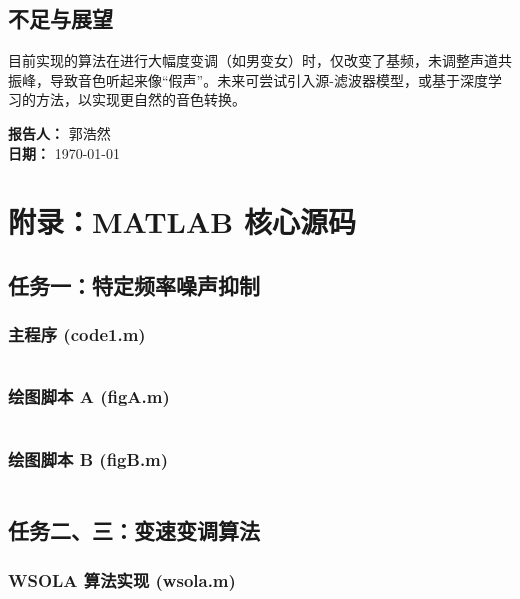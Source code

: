 \documentclass[12pt]{ctexart}
\begin{document}
\subsection{不足与展望}
目前实现的算法在进行大幅度变调（如男变女）时，仅改变了基频，未调整声道共振峰，导致音色听起来像“假声”。未来可尝试引入源-滤波器模型，或基于深度学习的方法，以实现更自然的音色转换。


\begin{flushright}
    \textbf{报告人：} 郭浩然 \\
    \textbf{日期：} \today
\end{flushright}


\newpage
\appendix
\section{附录：MATLAB 核心源码}

\subsection{任务一：特定频率噪声抑制}

\subsubsection{主程序 (code1.m)}
\inputminted{matlab}{task1/code1.m}

\subsubsection{绘图脚本 A (figA.m)}
\inputminted{matlab}{task1/figA.m}

\subsubsection{绘图脚本 B (figB.m)}
\inputminted{matlab}{task1/figB.m}

\subsection{任务二、三：变速变调算法}

\subsubsection{WSOLA 算法实现 (wsola.m)}
\inputminted{matlab}{task3/wsola.m}
\end{document}
